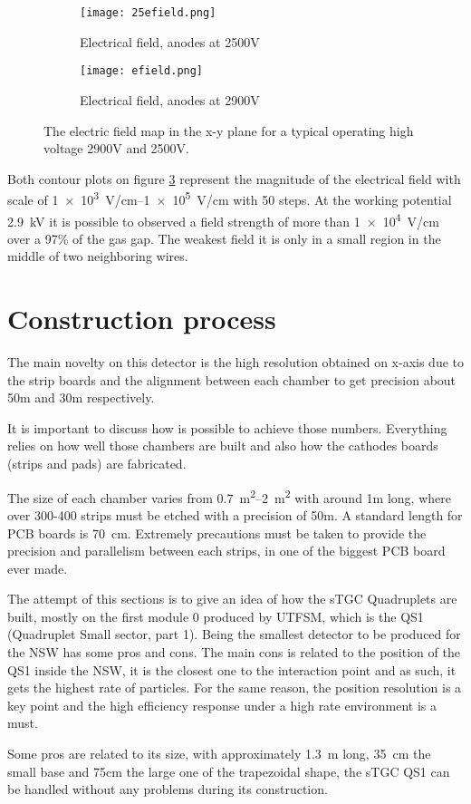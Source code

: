 \begin{figure}[ht]
		\centering
		\hspace*{\fill}
		\begin{subfigure}[b]{0.45\textwidth}
			\centering
			\texttt{[image: 25efield.png]}
			\caption{Electrical field, anodes at 2500V}\label{fig:25efield}
		\end{subfigure}
		\hfill
		\begin{subfigure}[b]{0.45\textwidth}
			\centering
			\texttt{[image: efield.png]}
			\caption{Electrical field, anodes at 2900V}\label{fig:efield}
		\end{subfigure}
		\hspace*{\fill}
		\caption{The electric field map in the x-y plane for a typical operating high voltage 2900V and 2500V.}\label{fig:efields}
\end{figure}

Both contour plots on figure \ref{fig:efields} represent the magnitude of the electrical field with scale of
\SIrange{1e3}{1e5}{V/cm} with 50 steps. At the working potential \SI{2.9}{kV} it is possible to observed a field
strength of  more than \SI{1e4}{V/cm} over a 97\% of the gas gap. The weakest field it is only in a small region in the
middle of two neighboring wires.
\section{Construction process}

The main novelty on this detector is the high resolution obtained on x-axis due to the strip boards and the alignment
between each chamber to get precision about 50\micro m and 30\micro m respectively.\par 
It is important to discuss how
is possible to achieve those numbers. Everything relies on how well those chambers are built and also how the cathodes
boards (strips and pads) are fabricated.\par The size of each chamber varies from \SIrange{0.7}{2}{m^2} with around 1m long,
where over 300-400 strips must be etched with a precision of 50\micro m. A standard length for PCB boards is \SI{70}{cm}.
Extremely precautions must be taken to provide the precision and parallelism between each strips, in one of the biggest PCB board ever made.\par 
The attempt of this sections is to
give an idea of how the sTGC Quadruplets are built, mostly on the first module 0 produced by UTFSM, which is the QS1
(Quadruplet Small sector, part 1).  Being the smallest detector to be produced for the NSW has some pros and cons. The
main cons is related to the position of the QS1 inside the NSW, it is the closest one to the interaction point and as
such, it gets the highest rate of particles. For the same reason, the position resolution is a key point and
the high efficiency response under a high rate environment is a must.\par
Some pros are related to its size, with approximately \SI{1.3}{m} long, \SI{35}{cm} the small base and 75cm the large one of the trapezoidal shape, the sTGC QS1 can be handled without any
problems during its construction.\par

